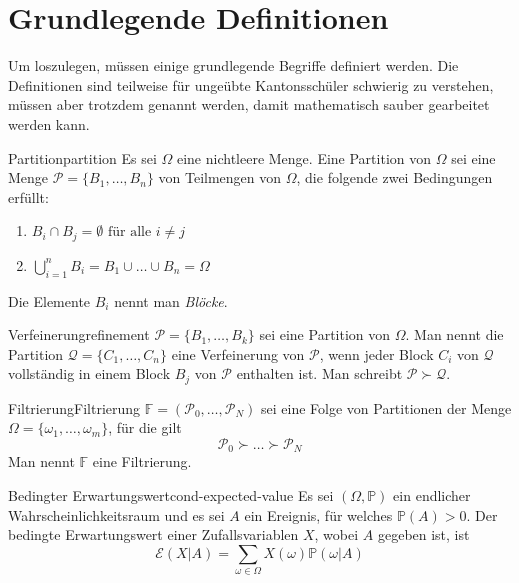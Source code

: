 \documentclass[11pt]{report} %
\begin{document}
\section{Grundlegende Definitionen}
Um loszulegen, müssen einige grundlegende Begriffe definiert werden. Die Definitionen sind teilweise für ungeübte Kantonsschüler schwierig zu verstehen, müssen aber trotzdem genannt werden, damit mathematisch sauber gearbeitet werden kann.
\begin{Definition}{Partition}{partition}
    Es sei $\Omega$ eine nichtleere Menge. Eine Partition von $\Omega$ sei eine Menge $\mathcal{P}=\{ B_1, \ldots, B_n\}$ von Teilmengen von $\Omega$, die folgende zwei Bedingungen erfüllt: 
    \begin{enumerate}
        \item $B_i \cap B_j = \emptyset \text{ für alle } i\neq j $
        \item $\displaystyle\bigcup_{i=1}^n B_i=B_1 \cup \ldots \cup B_n = \Omega$
    \end{enumerate}
    Die Elemente $B_i$ nennt man \textit{Blöcke}.
\end{Definition}
\begin{Definition}{Verfeinerung}{refinement}
    $\mathcal{P}=\{ B_1, \ldots, B_k\}$ sei eine Partition von $\Omega$. Man nennt die Partition $\mathcal{Q}=\{ C_1, \ldots, C_n\}$ eine Verfeinerung von $\mathcal{P}$, wenn jeder Block $C_i$ von $\mathcal{Q}$ vollständig in einem Block $B_j$ von $\mathcal{P}$ enthalten ist. Man schreibt $\mathcal{P}\succ\mathcal{Q}$.
\end{Definition}
\begin{Definition}{Filtrierung}{Filtrierung}
    $\mathbb{F}=(\mathcal{P}_0, \ldots, \mathcal{P}_N)$ sei eine Folge von Partitionen der Menge $\Omega = \{ \omega_1, \ldots, \omega_m \}$, für die gilt $$\mathcal{P}_0 \succ \ldots \succ \mathcal{P}_N$$ Man nennt $\mathbb{F}$ eine Filtrierung.
\end{Definition}
\begin{Definition}{Bedingter Erwartungswert}{cond-expected-value}
    Es sei $(\Omega, \mathbb{P})$ ein endlicher Wahrscheinlichkeitsraum und es sei $A$ ein Ereignis, für welches $\mathbb{P}(A)>0$. Der bedingte Erwartungswert einer Zufallsvariablen $X$, wobei $A$ gegeben ist, ist $$\mathcal{E}(X|A)=\sum_{\omega \in \Omega}X(\omega)\mathbb{P}(\omega|A)$$ 
\end{Definition}
\end{document}
